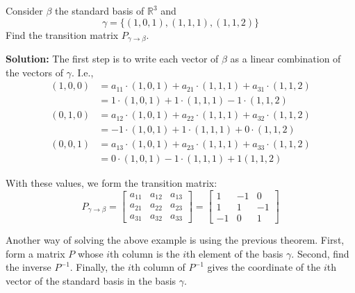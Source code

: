 \begin{example}
Consider $\beta$ the standard basis of $\mathbb{R}^3$ and \[ \gamma = \{(1,0,1),(1,1,1),(1,1,2)\}\] Find the transition matrix $P_{\gamma \to \beta}$.

\textbf{Solution:} The first step is to write each vector of $\beta$ as a linear combination of the vectors of $\gamma$. I.e.,
	\begin{equation*}
		\begin{aligned}
		(1,0,0) &= a_{11} \cdot (1,0,1) + a_{21} \cdot (1,1,1) + a_{31} \cdot (1,1,2) \\
		&= 1 \cdot (1,0,1) + 1 \cdot (1,1,1) - 1 \cdot (1,1,2)
		\end{aligned}
	\end{equation*}
	\begin{equation*}
		\begin{aligned}
		(0,1,0) &= a_{12} \cdot (1,0,1) + a_{22} \cdot (1,1,1) + a_{32} \cdot (1,1,2) \\
		&= -1 \cdot (1,0,1) + 1 \cdot (1,1,1) + 0 \cdot (1,1,2)
		\end{aligned}
	\end{equation*}
	\begin{equation*}
		\begin{aligned}
		(0,0,1) &= a_{13} \cdot  (1,0,1) + a_{23} \cdot  (1,1,1) + a_{33}  \cdot (1,1,2) \\
		&= 0 \cdot (1,0,1) - 1 \cdot (1,1,1) + 1 (1,1,2)
		\end{aligned}
	\end{equation*}

With these values, we form the transition matrix:
\[
P_{\gamma \to \beta} =
	\begin{bmatrix}
	a_{11} & a_{12} & a_{13} \\
	a_{21} & a_{22} & a_{23} \\
	a_{31} & a_{32} & a_{33}
	\end{bmatrix}
	=
	\begin{bmatrix}
	1 & -1 & 0 \\
	1 & 1 & -1 \\
	-1 & 0 & 1
	\end{bmatrix}
	\]
\end{example}

Another way of solving the above example is using the previous theorem. First, form a matrix $P$ whose $i$th column is the $i$th element of the basis $\gamma$. Second, find the inverse $P^{-1}$. Finally, the $i$th column of $P^{-1}$ gives the coordinate of the $i$th vector of the standard basis in the basis $\gamma$.

